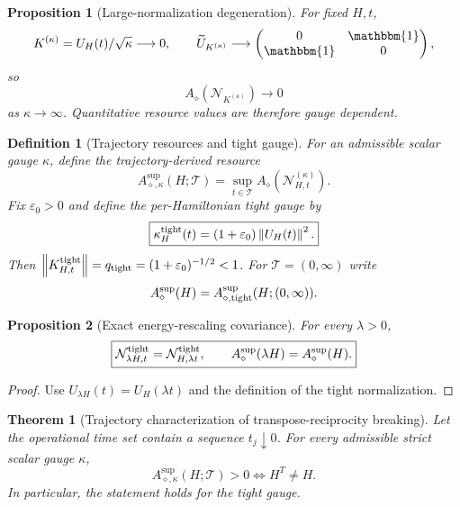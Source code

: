 \documentclass[reprint,amsmath,amssymb,aps,nofootinbib]{revtex4-2}
\newtheorem{definition}{Definition}
\newtheorem{theorem}{Theorem}
\newtheorem{proposition}{Proposition}
\newcommand{\id}{\mathbbm{1}}
\newcommand{\norm}[1]{\left\lVert #1\right\rVert}
\begin{document}
\begin{proposition}[Large-normalization degeneration]
For fixed $H,t$,
\begin{equation}
K^{(\kappa)}=U_H(t)/\sqrt\kappa\longrightarrow0,
\qquad
\widetilde U_{K^{(\kappa)}}\longrightarrow
\begin{pmatrix}0&\id\\\id&0\end{pmatrix},
\end{equation}
so
\begin{equation}
\boxed{A_\diamond(\mathcal N_{K^{(\kappa)}})\longrightarrow0}
\end{equation}
as $\kappa\to\infty$. Quantitative resource values are therefore gauge dependent.
\end{proposition}

\begin{definition}[Trajectory resources and tight gauge]
For an admissible scalar gauge $\kappa$, define the trajectory-derived resource
\begin{equation}
A_{\diamond,\kappa}^{\sup}(H;\mathcal T)=\sup_{t\in\mathcal T}
A_\diamond(\mathcal N_{H,t}^{(\kappa)}).
\end{equation}
Fix $\varepsilon_0>0$ and define the per-Hamiltonian tight gauge by
\begin{equation}
\boxed{\kappa_H^{\rm tight}(t)=(1+\varepsilon_0)\norm{U_H(t)}^2.}
\end{equation}
Then $\norm{K_{H,t}^{\rm tight}}=q_{\rm tight}=(1+\varepsilon_0)^{-1/2}<1$. For
$\mathcal T=(0,\infty)$ write
\begin{equation}
A_\diamond^{\sup}(H)=A_{\diamond,{\rm tight}}^{\sup}(H;(0,\infty)).
\end{equation}
\end{definition}

\begin{proposition}[Exact energy-rescaling covariance]
For every $\lambda>0$,
\begin{equation}
\boxed{\mathcal N_{\lambda H,t}^{\rm tight}=\mathcal N_{H,\lambda t}^{\rm tight},
\qquad
A_\diamond^{\sup}(\lambda H)=A_\diamond^{\sup}(H).}
\end{equation}
\end{proposition}

\begin{proof}
Use $U_{\lambda H}(t)=U_H(\lambda t)$ and the definition of the tight normalization.
\end{proof}

\begin{theorem}[Trajectory characterization of transpose-reciprocity breaking]
Let the operational time set contain a sequence $t_j\downarrow0$. For every admissible strict scalar
gauge $\kappa$,
\begin{equation}
\boxed{
A_{\diamond,\kappa}^{\sup}(H;\mathcal T)>0
\iff H^T\ne H.
}
\label{eq:trajectory-characterization}
\end{equation}
In particular, the statement holds for the tight gauge.
\end{theorem}
\end{document}
